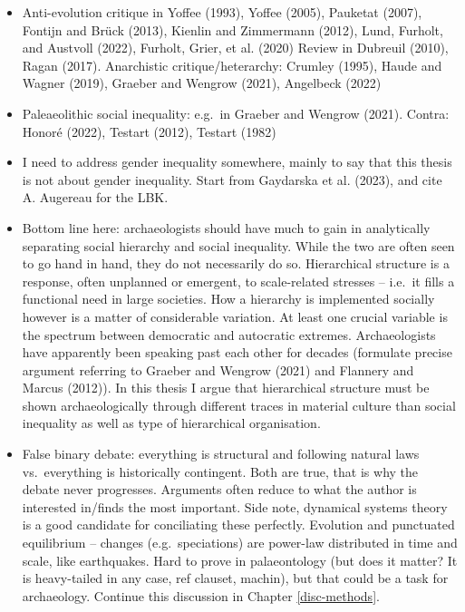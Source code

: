\documentclass[
  12pt,
  a4paper, twoside]{book}
\providecommand{\tightlist}{%
  \setlength{\itemsep}{0pt}\setlength{\parskip}{0pt}}
\begin{document}
\begin{itemize}
\tightlist
\item
  Anti-evolution critique in Yoffee (1993), Yoffee (2005), Pauketat (2007), Fontijn and Brück (2013), Kienlin and Zimmermann (2012), Lund, Furholt, and Austvoll (2022), Furholt, Grier, et al. (2020) Review in Dubreuil (2010), Ragan (2017). Anarchistic critique/heterarchy: Crumley (1995), Haude and Wagner (2019), Graeber and Wengrow (2021), Angelbeck (2022)
\item
  Paleaeolithic social inequality: e.g.~in Graeber and Wengrow (2021). Contra: Honoré (2022), Testart (2012), Testart (1982)
\item
  I need to address gender inequality somewhere, mainly to say that this thesis is not about gender inequality. Start from Gaydarska et al. (2023), and cite A. Augereau for the LBK.
\item
  Bottom line here: archaeologists should have much to gain in analytically separating social hierarchy and social inequality. While the two are often seen to go hand in hand, they do not necessarily do so. Hierarchical structure is a response, often unplanned or emergent, to scale-related stresses -- i.e.~it fills a functional need in large societies. How a hierarchy is implemented socially however is a matter of considerable variation. At least one crucial variable is the spectrum between democratic and autocratic extremes. Archaeologists have apparently been speaking past each other for decades (formulate precise argument referring to Graeber and Wengrow (2021) and Flannery and Marcus (2012)). In this thesis I argue that hierarchical structure must be shown archaeologically through different traces in material culture than social inequality as well as type of hierarchical organisation.
\item
  False binary debate: everything is structural and following natural laws vs.~everything is historically contingent. Both are true, that is why the debate never progresses. Arguments often reduce to what the author is interested in/finds the most important. Side note, dynamical systems theory is a good candidate for conciliating these perfectly. Evolution and punctuated equilibrium -- changes (e.g.~speciations) are power-law distributed in time and scale, like earthquakes. Hard to prove in palaeontology (but does it matter? It is heavy-tailed in any case, ref clauset, machin), but that could be a task for archaeology. Continue this discussion in Chapter \ref{disc-methods}.
\end{itemize}
\end{document}
